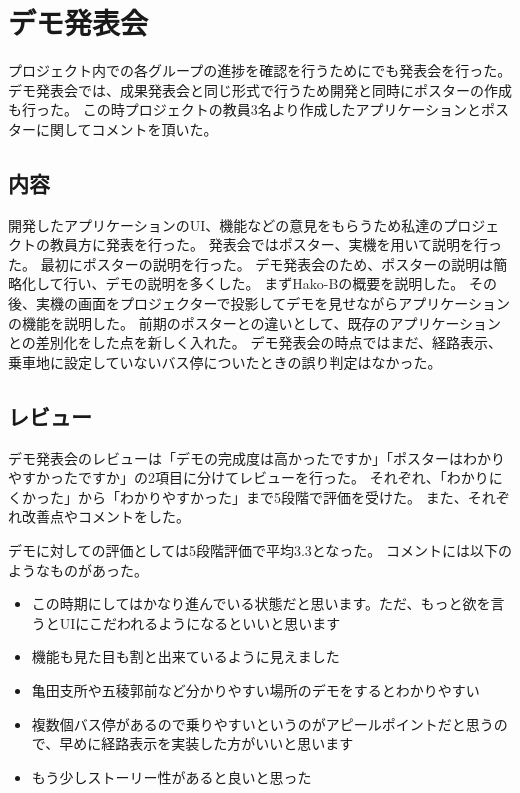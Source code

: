 \documentclass[openany,11pt,papersize]{jsbook}
\begin{document}

\section{デモ発表会}
プロジェクト内での各グループの進捗を確認を行うためにでも発表会を行った。
デモ発表会では、成果発表会と同じ形式で行うため開発と同時にポスターの作成も行った。
この時プロジェクトの教員3名より作成したアプリケーションとポスターに関してコメントを頂いた。


\subsection{内容}
開発したアプリケーションのUI、機能などの意見をもらうため私達のプロジェクトの教員方に発表を行った。
発表会ではポスター、実機を用いて説明を行った。
最初にポスターの説明を行った。
デモ発表会のため、ポスターの説明は簡略化して行い、デモの説明を多くした。
まずHako-Bの概要を説明した。
その後、実機の画面をプロジェクターで投影してデモを見せながらアプリケーションの機能を説明した。
前期のポスターとの違いとして、既存のアプリケーションとの差別化をした点を新しく入れた。
デモ発表会の時点ではまだ、経路表示、乗車地に設定していないバス停についたときの誤り判定はなかった。


\subsection{レビュー}
デモ発表会のレビューは「デモの完成度は高かったですか」「ポスターはわかりやすかったですか」の2項目に分けてレビューを行った。
それぞれ、「わかりにくかった」から「わかりやすかった」まで5段階で評価を受けた。
また、それぞれ改善点やコメントをした。

デモに対しての評価としては5段階評価で平均3.3となった。
コメントには以下のようなものがあった。
\begin{itemize}

\item この時期にしてはかなり進んでいる状態だと思います。ただ、もっと欲を言うとUIにこだわれるようになるといいと思います
\item 機能も見た目も割と出来ているように見えました
\item 亀田支所や五稜郭前など分かりやすい場所のデモをするとわかりやすい
\item 複数個バス停があるので乗りやすいというのがアピールポイントだと思うので、早めに経路表示を実装した方がいいと思います
\item もう少しストーリー性があると良いと思った

\end{itemize}
\end{document}
